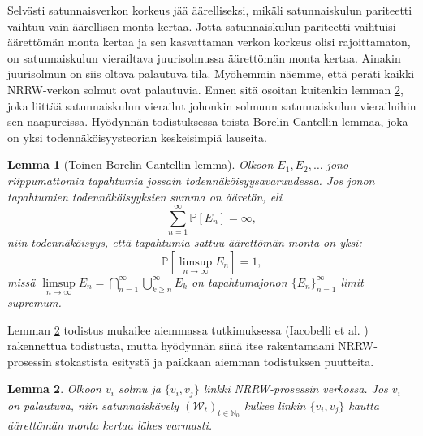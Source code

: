 \documentclass[finnish, 12pt, a4paper, sci, utf8, pdfa]{aaltothesis}
\newcommand{\N}{\mathbb{N}}
\newcommand{\Wrandom}{\mathcal{W}}
\newcommand*{\prob}{\mathbb{P}}
\newtheorem{lemma}{Lemma}
\begin{document}
Selvästi satunnaisverkon korkeus jää äärelliseksi, mikäli satunnaiskulun pariteetti vaihtuu vain äärellisen monta kertaa. Jotta satunnaiskulun pariteetti vaihtuisi äärettömän monta kertaa
ja sen kasvattaman verkon korkeus olisi rajoittamaton, on satunnaiskulun vierailtava juurisolmussa äärettömän monta kertaa. Ainakin juurisolmun on siis oltava palautuva tila. Myöhemmin
näemme, että peräti kaikki NRRW-verkon solmut ovat palautuvia. Ennen sitä osoitan kuitenkin lemman \ref{lemma:recurrence}, joka liittää satunnaiskulun vierailut johonkin solmuun 
satunnaiskulun vierailuihin sen naapureissa. Hyödynnän todistuksessa toista Borelin-Cantellin lemmaa, joka on yksi todennäköisyysteorian keskeisimpiä lauseita.
\begin{lemma}[Toinen Borelin-Cantellin lemma]
   Olkoon $ E_{1}, E_{2}, \ldots $ jono riippumattomia tapahtumia jossain todennäköisyysavaruudessa. Jos jonon tapahtumien todennäköisyyksien summa on ääretön, eli
   \[
      \sum_{n = 1}^{\infty} \prob \left[ E_{n} \right] = \infty,
   \]
   niin todennäköisyys, että tapahtumia sattuu äärettömän monta on yksi:
   \[
      \prob \left[ \limsup \limits_{n \rightarrow \infty} E_{n} \right] = 1,
   \]
   missä $ \limsup \limits_{n \rightarrow \infty} E_{n} = \bigcap_{n = 1}^{\infty} \bigcup_{k \geq n}^{\infty} E_{k} $ on tapahtumajonon $ \{ E_{n} \}_{n=1}^{\infty} $ limit supremum. 
\label{lemma:borel-cantelli}
\end{lemma}

Lemman \ref{lemma:recurrence} todistus mukailee aiemmassa tutkimuksessa (Iacobelli et al. \cite{Iacobelli}) rakennettua todistusta, mutta hyödynnän siinä itse rakentamaani NRRW-prosessin 
stokastista esitystä ja paikkaan aiemman todistuksen puutteita.
\begin{lemma}
Olkoon $ v_{i} $ solmu ja $ \{v_{i}, v_{j}\} $ linkki NRRW-prosessin verkossa. Jos $ v_{i} $ on palautuva, niin satunnaiskävely $ (\Wrandom_{t})_{t \in \N_{0}} $ kulkee linkin $ \{v_{i}, v_{j}\} $ kautta äärettömän monta kertaa lähes varmasti.
\label{lemma:recurrence}
\end{lemma}
\end{document}
